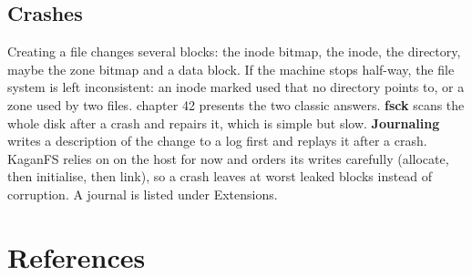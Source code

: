 \documentclass[11pt,a4paper]{article}
\begin{document}
\subsection{Crashes}

Creating a file changes several blocks: the inode bitmap, the inode, the directory, maybe the zone bitmap and a data
block. If the machine stops half-way, the file system is left inconsistent: an inode marked used that no directory
points to, or a zone used by two files. \OSTEP chapter 42 presents the two classic answers. \textbf{fsck} scans the
whole disk after a crash and repairs it, which is simple but slow. \textbf{Journaling} writes a description of the
change to a log first and replays it after a crash. KaganFS relies on  on the host for now and orders
its writes carefully (allocate, then initialise, then link), so a crash leaves at worst leaked blocks instead of
corruption. A journal is listed under Extensions.

\section{References}
\end{document}
